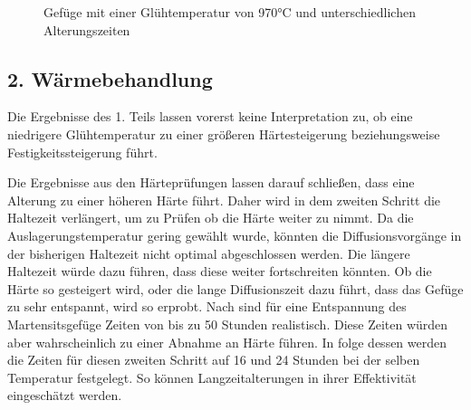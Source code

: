 \documentclass[a4paper, 11pt]{tubsreprt}
\begin{document}
\begin{figure} 		%
    \caption{Gefüge mit einer Glühtemperatur von 970°C und unterschiedlichen Alterungszeiten}
    \label{970 alterung}
\end{figure}



\subsection{2. Wärmebehandlung}
Die Ergebnisse des 1. Teils lassen vorerst keine Interpretation zu, ob eine niedrigere Glühtemperatur zu einer größeren Härtesteigerung beziehungsweise Festigkeitssteigerung führt. 

Die Ergebnisse aus den Härteprüfungen lassen darauf schließen, dass eine Alterung zu einer höheren Härte führt. Daher wird in dem zweiten Schritt die Haltezeit verlängert, um zu Prüfen ob die Härte weiter zu nimmt. Da die Auslagerungstemperatur gering gewählt wurde, könnten die Diffusionsvorgänge in der bisherigen Haltezeit nicht optimal abgeschlossen werden. Die längere Haltezeit würde dazu führen, dass diese weiter fortschreiten könnten. Ob die Härte so gesteigert wird, oder die lange Diffusionszeit dazu führt, dass das Gefüge zu sehr entspannt, wird so erprobt. Nach \cite{Gilbert2004} sind für eine Entspannung des Martensitsgefüge Zeiten von bis zu 50 Stunden realistisch. Diese Zeiten würden aber wahrscheinlich zu einer Abnahme an Härte führen. In folge dessen werden die Zeiten für diesen zweiten Schritt auf 16 und 24 Stunden bei der selben Temperatur festgelegt. So können Langzeitalterungen in ihrer Effektivität eingeschätzt werden. 
\end{document}

